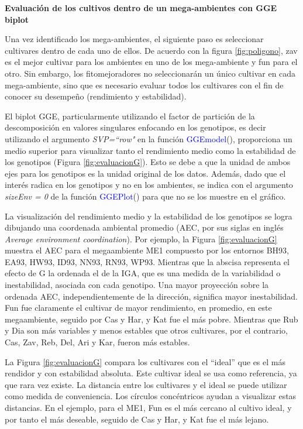 \textbf{Evaluación de los cultivos dentro de un mega-ambientes con GGE biplot}

Una vez identificado los mega-ambientes, el siguiente paso es seleccionar cultivares dentro de cada uno de ellos. De acuerdo con la figura  \ref{fig:poligono}, zav es el mejor cultivar para los ambientes en uno de los mega-ambiente y fun para el otro. Sin embargo, los fitomejoradores no seleccionarán un único cultivar en cada mega-ambiente, sino que es necesario evaluar todos los cultivares con el fin de conocer su desempeño (rendimiento y estabilidad).  

El biplot GGE, particularmente utilizando el factor de partición de la descomposición en valores singulares enfocando en los genotipos, es decir utilizando el argumento \emph{SVP=``row"} en la función \textcolor{blue}{GGEmodel}(), proporciona un medio superior para visualizar tanto el rendimiento medio como la estabilidad de los genotipos (Figura \ref{fig:evaluacionG}). Esto se debe a que la unidad de ambos ejes para los genotipos es la unidad original de los datos. Además, dado que el interés radica en los genotipos y no en los ambientes, se indica con el argumento \emph{sizeEnv = 0} de la función \textcolor{blue}{GGEPlot}() para que no se los muestre en el gráfico.


La visualización del rendimiento medio y la estabilidad de los genotipos se logra dibujando una coordenada ambiental promedio (AEC, por sus siglas en inglés \emph{Average environment coordination}). Por ejemplo, la Figura \ref{fig:evaluacionG}  muestra el AEC para el megaambiente ME1 compuesto por los entornos BH93, EA93, HW93, ID93, NN93, RN93, WP93. Mientras que la abscisa representa el efecto de G la ordenada el de la IGA, que es una medida de la variabilidad o inestabilidad, asociada con cada genotipo. Una mayor proyección sobre la ordenada AEC, independientemente de la dirección, significa mayor inestabilidad. Fun fue claramente el cultivar de mayor rendimiento, en promedio, en este megaambiente, seguido por Cas y Har, y Kat fue el más pobre. Mientras que Rub y Dia son más variables y menos estables que otros cultivares, por el contrario, Cas, Zav, Reb, Del, Ari y Kar, fueron más estables. 

La Figura \ref{fig:evaluacionG} compara los cultivares con el ``ideal” que es el más rendidor y con estabilidad absoluta. Este cultivar ideal se usa como referencia, ya que rara vez existe. La distancia entre los cultivares y el ideal se puede utilizar como medida de conveniencia. Los círculos concéntricos ayudan a visualizar estas distancias. En el ejemplo, para el ME1, Fun es el más cercano al cultivo ideal, y por tanto el más deseable, seguido de Cas y Har, y Kat fue el más lejano. \\

